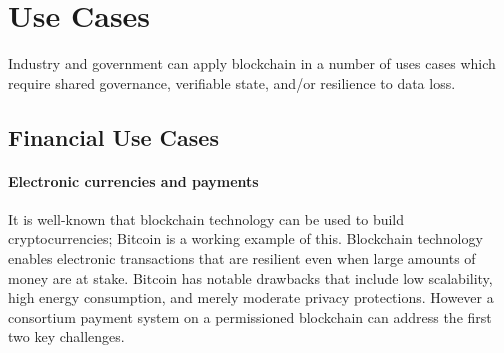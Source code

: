 
\section{Use Cases}
\label{sec:use-cases}

Industry and government can apply blockchain in a number of uses cases which 
require shared governance, verifiable state, and/or resilience to data loss. 


\subsection{Financial Use Cases}

\paragraph{Electronic currencies and payments}


It is well-known that blockchain technology can be used to build cryptocurrencies; Bitcoin is a working example of this. Blockchain technology enables electronic transactions that are resilient even when large amounts of money are at stake. Bitcoin has notable drawbacks that include low scalability, high energy consumption, and merely moderate privacy protections. However a consortium payment system on a permissioned blockchain can address the first two key challenges. 



